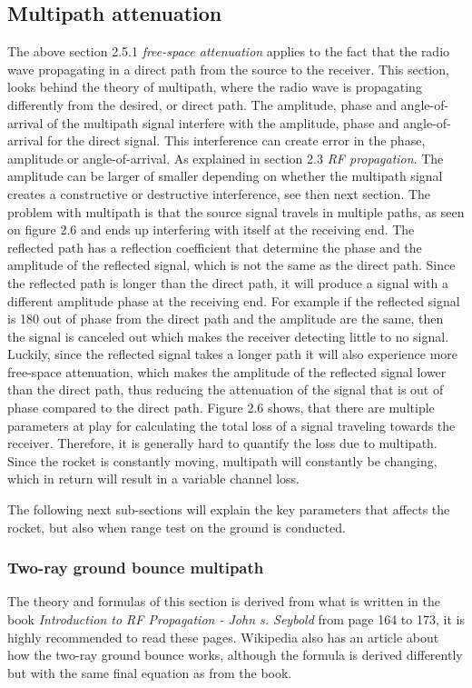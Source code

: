 \subsection{Multipath attenuation}
The above section 2.5.1 \textit{free-space attenuation} applies to the fact that the radio wave
propagating in a direct path from the source to the receiver. This section, looks behind the theory of multipath, where the radio wave is propagating differently from the desired, or direct path. The amplitude, phase and angle-of-arrival of the multipath signal interfere with the amplitude, phase and angle-of-arrival for the direct signal. This interference can create error in the phase, amplitude or angle-of-arrival. As explained in section 2.3 \textit{RF propagation}. The amplitude can be larger of smaller depending on whether the multipath signal creates a constructive or destructive interference, see then next section. The problem with multipath is that the source signal travels in multiple paths, as seen on figure 2.6 and ends up interfering with itself at the receiving end. The reflected path has a reflection coefficient that determine the phase and the amplitude of the reflected signal, which is not the same as the direct path. Since the reflected path is longer than the direct path, it will produce a signal with a different amplitude phase at the receiving end. For example if the reflected signal is 180 out of phase from the direct path and the amplitude are the same, then the signal is canceled out which makes the receiver detecting little to no signal. Luckily, since the reflected signal takes a longer path it will also experience more free-space attenuation, which makes the amplitude of the reflected signal lower than the direct path, thus reducing the attenuation of the signal that is out of phase compared to the direct path. Figure 2.6 shows, that there are multiple parameters at play for calculating the total loss of a signal traveling towards the receiver. Therefore, it is generally hard to quantify the loss due to multipath. Since the rocket is constantly moving, multipath will constantly be changing, which in return will result in a variable channel loss. 

The following next sub-sections will explain the key parameters that affects the rocket, but also when range test on the ground is conducted. 

\subsubsection{Two-ray ground bounce multipath}
The theory and formulas of this section is derived from what is written in the book \textit{Introduction to RF Propagation - John s. Seybold}\cite{RFpropagation} from page 164 to 173, it is highly recommended to read these pages. Wikipedia also has an article\cite{Two-ray} about how the two-ray ground bounce works, although the formula is derived differently but with the same final equation as from the book. 

